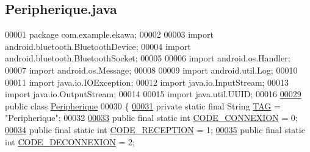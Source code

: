 \hypertarget{_peripherique_8java_source}{}\subsection{Peripherique.\+java}
\label{_peripherique_8java_source}

\begin{DoxyCode}
00001 \textcolor{keyword}{package }com.example.ekawa;
00002 
00003 \textcolor{keyword}{import} android.bluetooth.BluetoothDevice;
00004 \textcolor{keyword}{import} android.bluetooth.BluetoothSocket;
00005 
00006 \textcolor{keyword}{import} android.os.Handler;
00007 \textcolor{keyword}{import} android.os.Message;
00008 
00009 \textcolor{keyword}{import} android.util.Log;
00010 
00011 \textcolor{keyword}{import} java.io.IOException;
00012 \textcolor{keyword}{import} java.io.InputStream;
00013 \textcolor{keyword}{import} java.io.OutputStream;
00014 
00015 \textcolor{keyword}{import} java.util.UUID;
00016 
\hyperlink{classcom_1_1example_1_1ekawa_1_1_peripherique}{00029} \textcolor{keyword}{public} \textcolor{keyword}{class }\hyperlink{classcom_1_1example_1_1ekawa_1_1_peripherique}{Peripherique}
00030 \{
\hyperlink{classcom_1_1example_1_1ekawa_1_1_peripherique_a80ad0e52c530c7dc114109ff777ae975}{00031}     \textcolor{keyword}{private} \textcolor{keyword}{static} \textcolor{keyword}{final} String \hyperlink{classcom_1_1example_1_1ekawa_1_1_peripherique_a80ad0e52c530c7dc114109ff777ae975}{TAG} = \textcolor{stringliteral}{"Peripherique"}; 
00032 
\hyperlink{classcom_1_1example_1_1ekawa_1_1_peripherique_addb8ee767dc82567360551db1004463e}{00033}     \textcolor{keyword}{public} \textcolor{keyword}{final} \textcolor{keyword}{static} \textcolor{keywordtype}{int} \hyperlink{classcom_1_1example_1_1ekawa_1_1_peripherique_addb8ee767dc82567360551db1004463e}{CODE\_CONNEXION} = 0;
\hyperlink{classcom_1_1example_1_1ekawa_1_1_peripherique_a532f5da1747b68217b8764db9b85e845}{00034}     \textcolor{keyword}{public} \textcolor{keyword}{final} \textcolor{keyword}{static} \textcolor{keywordtype}{int} \hyperlink{classcom_1_1example_1_1ekawa_1_1_peripherique_a532f5da1747b68217b8764db9b85e845}{CODE\_RECEPTION} = 1;
\hyperlink{classcom_1_1example_1_1ekawa_1_1_peripherique_a99f0e30a113d64b30598c6305657dcee}{00035}     \textcolor{keyword}{public} \textcolor{keyword}{final} \textcolor{keyword}{static} \textcolor{keywordtype}{int} \hyperlink{classcom_1_1example_1_1ekawa_1_1_peripherique_a99f0e30a113d64b30598c6305657dcee}{CODE\_DECONNEXION} = 2;

\end{DoxyCode}
